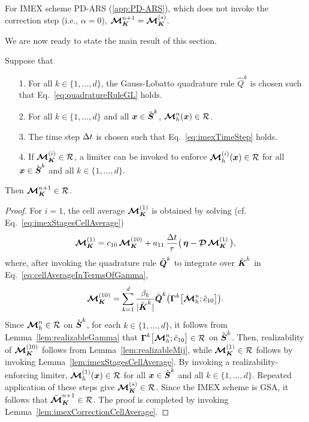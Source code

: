\begin{rem}
  For IMEX scheme PD-ARS (\ref{app:PD-ARS}), which does not invoke the correction step (i.e., $\alpha=0$), $\boldsymbol{\mathcal{M}}_{\boldsymbol{K}}^{n+1}=\boldsymbol{\mathcal{M}}_{\boldsymbol{K}}^{(s)}$.  
\end{rem}

We are now ready to state the main result of this section.  
\begin{theorem}
  Suppose that
  \begin{itemize}
    \item[1.] For all $k\in\{1,\ldots,d\}$, the Gauss-Lobatto quadrature rule $\hat{Q}^{k}$ is chosen such that Eq.~\eqref{eq:quadratureRuleGL} holds.  
    \item[2.] For all $k\in\{1,\ldots,d\}$ and all $\boldsymbol{x}\in\hat{\boldsymbol{S}}^{k}$, $\boldsymbol{\mathcal{M}}_{h}^{n}(\boldsymbol{x})\in\mathcal{R}$.
    \item[3.] The time step $\Delta t$ is chosen such that Eq.~\eqref{eq:imexTimeStep} holds.  
    \item[4.] If $\boldsymbol{\mathcal{M}}_{\boldsymbol{K}}^{(i)}\in\mathcal{R}$, a limiter can be invoked to enforce $\boldsymbol{\mathcal{M}}_{h}^{(i)}(\boldsymbol{x})\in\mathcal{R}$ for all $\boldsymbol{x}\in\hat{\boldsymbol{S}}^{k}$ and all $k\in\{1,\ldots,d\}$.
  \end{itemize}
  Then $\boldsymbol{\mathcal{M}}_{\boldsymbol{K}}^{n+1}\in\mathcal{R}$.  
  \label{the:realizableDGIMEX}
\end{theorem}
\begin{proof}
  For $i=1$, the cell average $\boldsymbol{\mathcal{M}}_{\boldsymbol{K}}^{(1)}$ is obtained by solving (cf. Eq.~\eqref{eq:imexStagesCellAverage})
  \begin{equation*}
    \boldsymbol{\mathcal{M}}_{\boldsymbol{K}}^{(1)}=c_{10}\,\boldsymbol{\mathcal{M}}_{\boldsymbol{K}}^{(10)}+a_{11}\,\frac{\Delta t}{\tau}\big(\,\boldsymbol{\eta}-\boldsymbol{\mathcal{D}}\,\boldsymbol{\mathcal{M}}_{\boldsymbol{K}}^{(1)}\,\big),
  \end{equation*}
  where, after invoking the quadrature rule $\tilde{\boldsymbol{Q}}^{k}$ to integrate over $\tilde{\boldsymbol{K}}^{k}$ in Eq.~\eqref{eq:cellAverageInTermsOfGamma},
  \begin{equation*}
    \boldsymbol{\mathcal{M}}_{\boldsymbol{K}}^{(10)}
    =\sum_{k=1}^{d}\frac{\beta_{k}}{|\tilde{\boldsymbol{K}}^{k}|}\tilde{\boldsymbol{Q}}^{k}\big(\boldsymbol{\Gamma}^{k}\big[\boldsymbol{\mathcal{M}}_{h}^{n};\hat{c}_{10}\big]\big).  
  \end{equation*}
  Since $\boldsymbol{\mathcal{M}}_{h}^{n}\in\mathcal{R}$ on $\hat{\boldsymbol{S}}^{k}$, for each $k\in\{1,\ldots,d\}$, it follows from Lemma~\ref{lem:realizableGamma} that $\boldsymbol{\Gamma}^{k}\big[\boldsymbol{\mathcal{M}}_{h}^{n};\hat{c}_{10}\big]\in\mathcal{R}$ on $\tilde{\boldsymbol{S}}^{k}$.  
  Then, realizability of $\boldsymbol{\mathcal{M}}_{\boldsymbol{K}}^{(10)}$ follows from Lemma~\ref{lem:realizableMij}, while $\boldsymbol{\mathcal{M}}_{\boldsymbol{K}}^{(1)}\in\mathcal{R}$ follows by invoking Lemma~\ref{lem:imexStagesCellAverage}.  
  By invoking a realizability-enforcing limiter, $\boldsymbol{\mathcal{M}}_{h}^{(1)}(\boldsymbol{x})\in\mathcal{R}$ for all $\boldsymbol{x}\in\hat{\boldsymbol{S}}^{k}$ and all $k\in\{1,\ldots,d\}$.  
  Repeated application of these steps give $\boldsymbol{\mathcal{M}}_{\boldsymbol{K}}^{(s)}\in\mathcal{R}$.  
  Since the IMEX scheme is GSA, it follows that $\tilde{\boldsymbol{\mathcal{M}}}_{\boldsymbol{K}}^{n+1}\in\mathcal{R}$.  
  The proof is completed by invoking Lemma~\ref{lem:imexCorrectionCellAverage}.  
\end{proof}